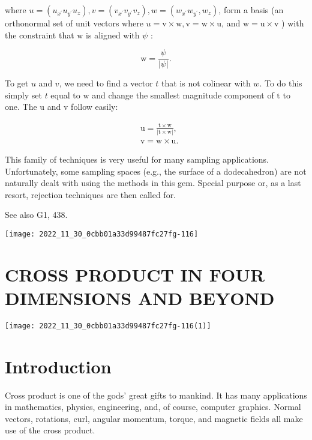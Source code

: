 \begin{CJK}{UTF8}{gbsn}
where $u=\left(u_{x^{\prime}} u_{y^{\prime}} u_{z}\right), v=\left(v_{x^{\prime}} v_{y^{\prime}} v_{z}\right), w=\left(w_{x^{\prime}} w_{y^{\prime}}, w_{z}\right)$, form a basis (an orthonormal set of unit vectors where $u=\mathrm{v} \times \mathrm{w}, \mathrm{v}=\mathrm{w} \times \mathrm{u}$, and $\mathrm{w}=\mathrm{u} \times \mathrm{v}$ ) with the constraint that $\mathrm{w}$ is aligned with $\psi$ :

$$
\mathrm{w}=\frac{\psi}{|\psi|} .
$$

To get $u$ and $v$, we need to find a vector $t$ that is not colinear with $w$. To do this simply set $t$ equal to $\mathrm{w}$ and change the smallest magnitude component of $\mathrm{t}$ to one. The $\mathrm{u}$ and $\mathrm{v}$ follow easily:

$$
\begin{aligned}
&\mathrm{u}=\frac{\mathrm{t} \times \mathrm{w}}{|\mathrm{t} \times \mathrm{w}|}, \\
&\mathrm{v}=\mathrm{w} \times \mathrm{u} .
\end{aligned}
$$

This family of techniques is very useful for many sampling applications. Unfortunately, some sampling spaces (e.g., the surface of a dodecahedron) are not naturally dealt with using the methods in this gem. Special purpose or, as a last resort, rejection techniques are then called for.

See also G1, 438.

\begin{center}
\texttt{[image: 2022\_11\_30\_0cbb01a33d99487fc27fg-116]}
\end{center}

\section{CROSS PRODUCT IN FOUR DIMENSIONS AND BEYOND}
\begin{center}
\texttt{[image: 2022\_11\_30\_0cbb01a33d99487fc27fg-116(1)]}
\end{center}

\section{Introduction}
Cross product is one of the gods' great gifts to mankind. It has many applications in mathematics, physics, engineering, and, of course, computer graphics. Normal vectors, rotations, curl, angular momentum, torque, and magnetic fields all make use of the cross product.


\end{CJK}
